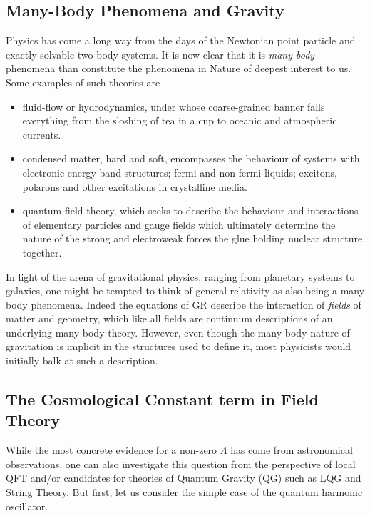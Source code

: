 \begin{doublespace}
\section{Many-Body Phenomena and Gravity}

Physics has come a long way from the days of the Newtonian point particle and exactly solvable two-body systems. It is now clear that it is \emph{many body} phenomena than constitute the phenomena in Nature of deepest interest to us. Some examples of such theories are

\begin{itemize}
\item fluid-flow or hydrodynamics, under whose coarse-grained banner falls everything from the sloshing of tea in a cup to oceanic and atmospheric currents.
\item condensed matter, hard and soft, encompasses the behaviour of systems with electronic energy band structures; fermi and non-fermi liquids; excitons, polarons and other excitations in crystalline media.
\item quantum field theory, which seeks to describe the behaviour and interactions of elementary particles and gauge fields which ultimately determine the nature of the strong and electroweak forces the glue holding nuclear structure together.
\end{itemize}

In light of the arena of gravitational physics, ranging from planetary systems to galaxies, one might be tempted to think of general relativity as also being a many body phenomena. Indeed the equations of GR describe the interaction of \emph{fields} of matter and geometry, which like all fields are continuum descriptions of an underlying many body theory. However, even though the many body nature of gravitation is implicit in the structures used to define it, most physicists would initially balk at such a description.

\subsection{The Cosmological Constant term in Field Theory}

While the most concrete evidence for a non-zero $\Lambda$ has come from astronomical observations, one can also investigate this question from the perspective of local QFT and/or candidates for theories of Quantum Gravity (QG) such as LQG and String Theory. But first, let us consider the simple case of the quantum harmonic oscillator.


\end{doublespace}
